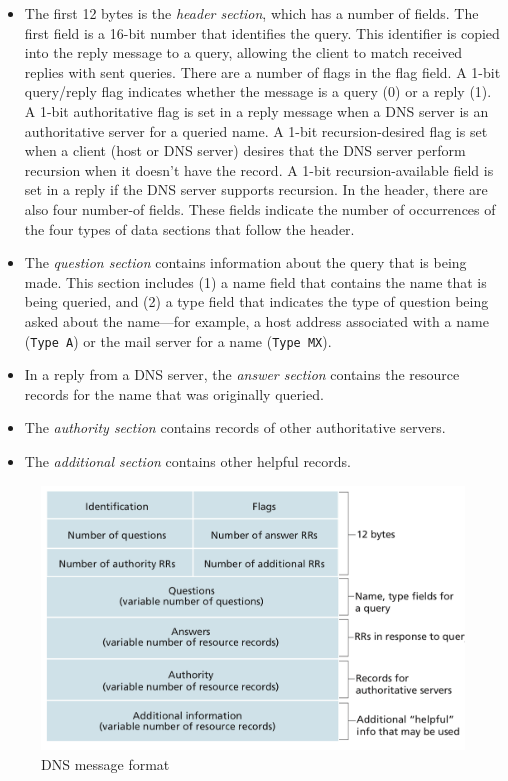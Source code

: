 \documentclass[11pt]{article}
\begin{document}
\begin{itemize}

	\item 
	
	The first 12 bytes is the \textit{header section}, which has a number of fields. The first field is a 16-bit number that identifies the query. This identifier is copied into the reply message to a query, allowing the client to match received replies with sent queries. There are a number of flags in the flag field. A 1-bit query/reply flag indicates whether the message is a query (0) or a reply (1). A 1-bit authoritative flag is set in a reply message when a DNS server is an authoritative server for a queried name. A 1-bit recursion-desired flag is set when a client (host or DNS server) desires that the DNS server perform recursion when it doesn’t have the record. A 1-bit recursion-available field is set in a reply if the DNS server supports recursion. In the header, there are also four number-of fields. These fields indicate the number of occurrences of the four types of data sections that follow the header.
	
	\item
	
	The \textit{question section} contains information about the query that is being made. This section includes (1) a name field that contains the name that is being queried, and (2) a type field that indicates the type of question being asked about the name—for example, a host address associated with a name (\texttt{Type A}) or the mail server for a name (\texttt{Type MX}).
	
	\item
	
	In a reply from a DNS server, the \textit{answer section} contains the resource records for the name that was originally queried.
	
	\item
	
	The \textit{authority section} contains records of other authoritative servers.
	
	\item
	
	The \textit{additional section} contains other helpful records.


\end{itemize}

\begin{figure}[h]
	\centering
	\includegraphics[width=0.8\linewidth]{images/DnsMessage.png}
	\caption{DNS message format}
	\label{fig:DnsMessage}
\end{figure}
\end{document}
